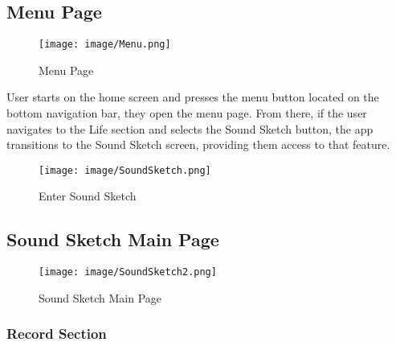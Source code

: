 \documentclass[conference]{IEEEtran}
\begin{document}
\subsection{Menu Page}

\begin{figure}[h!]
    \centering
    \texttt{[image: image/Menu.png]}
    \caption{Menu Page}
    \label{fig:enter-label}
\end{figure}

\noindent User starts on the home screen and presses the menu button located on the bottom navigation bar, they open the menu page. From there, if the user navigates to the Life section and selects the Sound Sketch button, the app transitions to the Sound Sketch screen, providing them access to that feature. \\

\begin{figure}[h!]
    \centering
    \texttt{[image: image/SoundSketch.png]}
    \caption{Enter Sound Sketch}
    \label{fig:enter-label}
\end{figure}

\subsection{Sound Sketch Main Page}

\begin{figure}[h!]
    \centering
    \texttt{[image: image/SoundSketch2.png]}
    \caption{Sound Sketch Main Page}
    \label{fig:enter-label}
\end{figure}

\subsubsection{Record Section}
\end{document}

